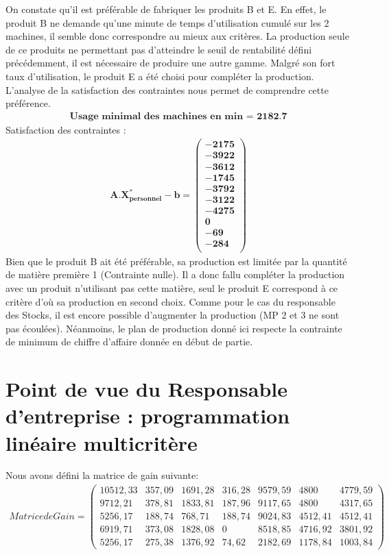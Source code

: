 \documentclass[12pt]{article}
\begin{document}
On constate qu'il est préférable de fabriquer les produits B et E. En effet, le produit B ne demande qu'une minute de temps d'utilisation cumulé sur les 2 machines, il semble donc correspondre au mieux aux critères. La production seule de ce produits ne permettant pas d'atteindre le seuil de rentabilité défini précédemment, il est nécessaire de produire une autre gamme. Malgré son fort taux d'utilisation, le produit E a été choisi pour compléter la production. L'analyse de la satisfaction des contraintes nous permet de comprendre cette préférence.
\begin{align*}
\textbf{Usage minimal des machines en min = 2182.7}
\end{align*}
Satisfaction des contraintes : 
\begin{align*}
\boldsymbol{A.X^{*}_{personnel} - b = 
   \left (
   \begin{aligned}
      -2175 \\
      -3922 \\
      -3612 \\
      -1745 \\
      -3792 \\
      -3122 \\
      -4275 \\
      0 \\
      -69 \\
      -284\\
   \end{aligned}
   \right )
 } 
\end{align*}
Bien que le produit B ait été préférable, sa production est limitée par la quantité de matière première 1 (Contrainte nulle). Il a donc fallu compléter la production avec un produit n'utilisant pas cette matière, seul le produit E correspond à ce critère d'où sa production en second choix.
Comme pour le cas du responsable des Stocks, il est encore possible d'augmenter la production (MP 2 et 3 ne sont pas écoulées). Néanmoins, le plan de production donné ici respecte la contrainte de minimum de chiffre d'affaire donnée en début de partie.
\section{Point de vue du Responsable d'entreprise : programmation linéaire multicritère}
Nous avons défini la matrice de gain suivante:
\begin{align*}
Matrice de Gain =
 \begin{pmatrix}
  10512,33	&357,09	&1691,28 &316,28& 9579,59 &4800 &4779,59\\
9712,21	&378,81	&1833,81	&187,96	&9117,65	&4800	&4317,65\\
5256,17	&188,74	&768,71	&188,74	&9024,83	&4512,41	&4512,41\\
6919,71	&373,08	&1828,08	&0	&8518,85	&4716,92	&3801,92\\
5256,17	&275,38	&1376,92 &74,62	&2182,69   &1178,84 &1003,84
 \end{pmatrix}
\end{align*}
\end{document}

